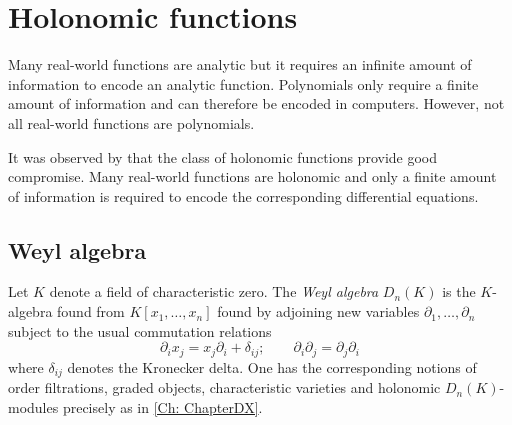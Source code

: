

\section{Holonomic functions}\label{sec: HolAlgorithm}
Many real-world functions are analytic but it requires an infinite amount of information to encode an analytic function.
Polynomials only require a finite amount of information and can therefore be encoded in computers.
However, not all real-world functions are polynomials.

It was observed by \cite{zeilberger1990holonomic} that the class of holonomic functions provide good compromise.
Many real-world functions are holonomic and only a finite amount of information is required to encode the corresponding differential equations.
\subsection{Weyl algebra}
Let $K$ denote a field of characteristic zero.
The {\it Weyl algebra} $D_n(K)$ is the $K$-algebra found from $K[x_1,\ldots,x_n]$ found by adjoining new variables $\partial_1,\ldots,\partial_n$ subject to the usual commutation relations
$$\partial_i x_j = x_j \partial_i + \delta_{ij};\qquad \partial_i \partial_j = \partial_j \partial_i $$
where $\delta_{ij}$ denotes the Kronecker delta.
One has the corresponding notions of order filtrations, graded objects, characteristic varieties and holonomic $D_n(K)$-modules precisely as in \cref{Ch: ChapterDX}.

